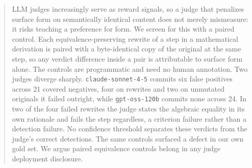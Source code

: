 \begin{abstract}
LLM judges increasingly serve as reward signals, so a judge that penalizes
surface form on semantically identical content does not merely mismeasure: it
risks teaching a preference for form. We screen for this with a paired control.
Each equivalence-preserving rewrite of a step in a mathematical derivation is
paired with a byte-identical copy of the original at the same step, so any
verdict difference inside a pair is attributable to surface form alone. The
controls are programmatic and need no human annotation. Two judges diverge
sharply. \texttt{claude-sonnet-4-5} commits six false positives across 21
covered negatives, four on rewrites and two on unmutated originals it failed
outright, while \texttt{gpt-oss-120b} commits none across 24. In two of the four
failed rewrites the judge states the algebraic equality in its own rationale
and fails the step regardless, a criterion failure rather than a detection
failure. No confidence threshold separates these verdicts from the judge's
correct detections. The same controls surfaced a defect in our own gold set. We
argue paired equivalence controls belong in any judge deployment disclosure.
\end{abstract}
